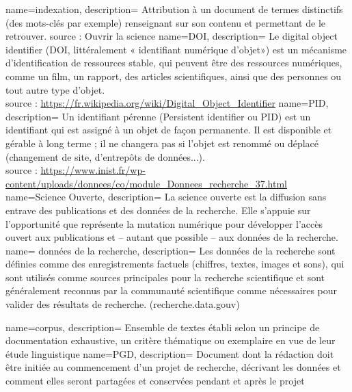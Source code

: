 {
    name=indexation,
    description={
    Attribution à un document de termes distinctifs (des mots-clés par exemple) renseignant sur son contenu et permettant de le retrouver.
    source : Ouvrir la science
    }
}
{
    name=DOI,
    description={
    Le digital object identifier (DOI, littéralement « identifiant numérique d'objet») est un mécanisme d'identification de ressources stable, qui peuvent être des ressources numériques, comme un film, un rapport, des articles scientifiques, ainsi que des personnes ou tout autre type d'objet.\\
    source : \url{https://fr.wikipedia.org/wiki/Digital_Object_Identifier}
    }
}
{
    name=PID,
    description={
    Un identifiant pérenne (Persistent identifier ou PID) est un identifiant qui est assigné à un objet de façon permanente. Il est disponible et gérable à long terme ; il ne changera pas si l'objet est renommé ou déplacé (changement de site, d'entrepôts de données...).\\ 
    source : \url{https://www.inist.fr/wp-content/uploads/donnees/co/module_Donnees_recherche_37.html}
    }
}
{
    name=Science Ouverte,
    description={
    La science ouverte est la diffusion sans entrave des publications et des données de la recherche. Elle s’appuie sur l’opportunité que représente la mutation numérique pour développer l’accès ouvert aux publications et – autant que possible – aux données de la recherche.
    }
}
{
    name= données de la recherche,
    description={
    Les données de la recherche sont définies comme des enregistrements factuels (chiffres, textes, images et sons), qui sont utilisés comme sources principales pour la recherche scientifique et sont généralement reconnus par la communauté scientifique comme nécessaires pour valider des résultats de recherche. (recherche.data.gouv)
                }
}

{
    name=corpus,
    description={
                Ensemble de textes établi selon un principe de documentation exhaustive, un critère thématique ou exemplaire en vue de leur étude linguistique
                }
}
{
    name=PGD,
    description={
                Document dont la rédaction doit être initiée au commencement d'un projet de recherche, décrivant les données et comment elles seront partagées et conservées pendant et après le projet
                }
}

